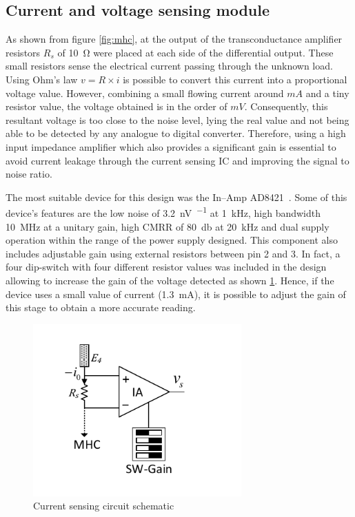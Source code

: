 

\subsection{Current and voltage sensing module}
\label{section V&I sense}
As shown from figure \ref{fig:mhc}, at the output of the transconductance amplifier resistors $R_s$ of \SI{10}{\ohm} were placed at each side of the differential output. These small resistors sense the electrical current passing through the unknown load. Using Ohm's law $v=R \times i$ is possible to convert this current into a proportional voltage value. However, combining a small flowing current around $mA$ and a tiny resistor value, the voltage obtained is in the order of $mV$. Consequently, this resultant voltage is too close to the noise level, lying the real value and not being able to be detected by any analogue to digital converter. Therefore, using a high input impedance amplifier which also provides a significant gain is essential to avoid current leakage through the current sensing IC and improving the signal to noise ratio.  

The most suitable device for this design was the In–Amp AD8421~\cite{ad:AD8421}. Some of this device's features are the low noise of \SI{3.2}{\nano\volt\per{}} at \SI{1}{\kHz}, high bandwidth \SI{10}{\MHz} at a unitary gain, high CMRR of \SI{80}{\decibel} at \SI{20}{\kHz} and dual supply operation within the range of the power supply designed. This component also includes adjustable gain using external resistors between pin 2 and 3. In fact, a four dip-switch with four different resistor values was included in the design allowing to increase the gain of the voltage detected as shown \ref{fig:peak}. Hence, if the device uses a small value of current (\SI{1.3}{\mA}), it is possible to adjust the gain of this stage to obtain a more accurate reading.

\begin{figure}[!htpb]
	\centering
	\includegraphics[width=8cm,keepaspectratio]{figure4}
	\caption{Current sensing circuit schematic}
	\label{fig:peak}
\end{figure}

